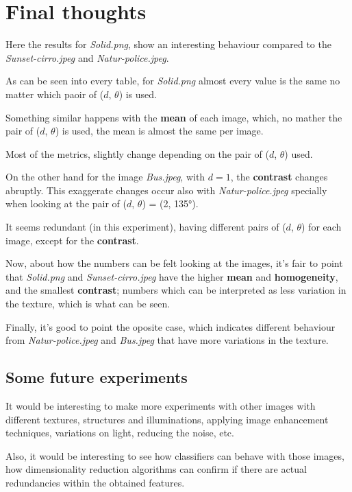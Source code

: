 \section{Final thoughts}

Here the results for \textit{Solid.png}, show an interesting behaviour
compared to the \textit{Sunset-cirro.jpeg} and \textit{Natur-police.jpeg}.

As can be seen into every table, for \textit{Solid.png} almost every value
is the same no matter which paoir of ($d$, $\theta$) is used.

Something similar happens with the \textbf{mean} of each image, which, no mather
the pair of ($d$, $\theta$) is used, the mean is almost the same per image.

Most of the metrics, slightly change depending on the pair of ($d$, $\theta$) used.

On the other hand for the image \textit{Bus.jpeg}, with $d=1$, the \textbf{contrast} changes
abruptly. This exaggerate changes occur also with \textit{Natur-police.jpeg}
specially when looking at the pair of ($d$, $\theta$) = (2, 135°).

It seems redundant (in this experiment), having different pairs of ($d$, $\theta$)
for each image, except for the \textbf{contrast}.


Now, about how the numbers can be felt looking at the images, it's fair to
point that \textit{Solid.png} and \textit{Sunset-cirro.jpeg} have the higher
\textbf{mean} and \textbf{homogeneity}, and the smallest \textbf{contrast};
numbers which can be interpreted as less variation in the texture, which is
what can be seen.


Finally, it's good to point the oposite case, which indicates different
behaviour from \textit{Natur-police.jpeg} and \textit{Bus.jpeg} that
have more variations in the texture.

\subsection{Some future experiments}

It would be interesting to make more experiments with other images with
different textures, structures and illuminations, applying image enhancement
techniques, variations on light, reducing the noise, etc.

Also, it would be interesting to see how classifiers can behave with those
images, how dimensionality reduction algorithms can confirm if
there are actual redundancies within the obtained features.
